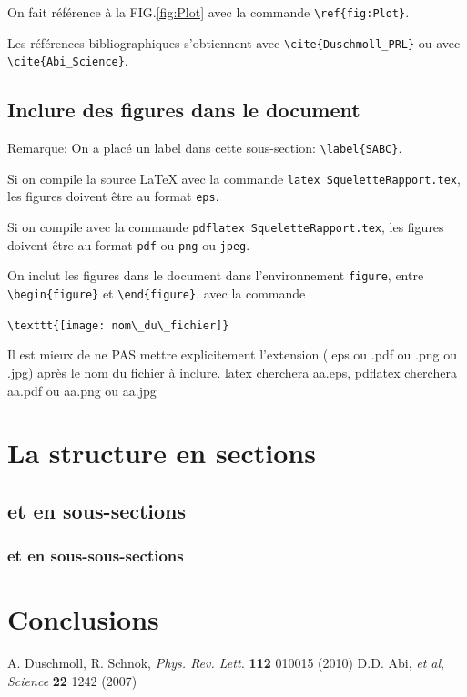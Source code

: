 \documentclass[a4paper,12pt,twoside]{article}
\begin{document}
On fait r\'ef\'erence \`a la FIG.\ref{fig:Plot} avec la commande
\verb|\ref{fig:Plot}|.

Les r\'ef\'erences bibliographiques \cite{Duschmoll_PRL}
s'obtiennent avec \verb|\cite{Duschmoll_PRL}|
ou avec \cite{Abi_Science} \verb|\cite{Abi_Science}|.

\subsection{Inclure des figures dans le document} \label{SABC}
Remarque: On a plac\'e un label dans cette sous-section: \verb|\label{SABC}|.

Si on compile la source \LaTeX{} avec la commande
\verb|latex SqueletteRapport.tex|,
les figures doivent \^etre au format \verb|eps|.

Si on compile avec la commande
\verb|pdflatex SqueletteRapport.tex|,
les figures doivent \^etre au format \verb|pdf| ou \verb|png|
ou \verb|jpeg|.

On inclut les figures dans le document dans l'environnement \verb|figure|, entre \verb|\begin{figure}| et \verb|\end{figure}|, avec la commande

\verb|\texttt{[image: nom\_du\_fichier]} |

Il est mieux de ne PAS mettre explicitement l'extension (.eps ou .pdf ou .png ou .jpg) après le nom du fichier à inclure. latex cherchera aa.eps, pdflatex cherchera aa.pdf ou  aa.png ou aa.jpg

\section{La structure en sections}

\subsection{et en sous-sections}

\subsubsection{et en sous-sous-sections}


\section{Conclusions}



\begin{thebibliography}{99}
 A. Duschmoll, R. Schnok, {\it Phys. Rev. Lett.} {\bf 112} 010015 (2010)
 D.D. Abi, {\it et al}, {\it Science} {\bf 22} 1242 (2007)
\end{thebibliography}
\end{document}
